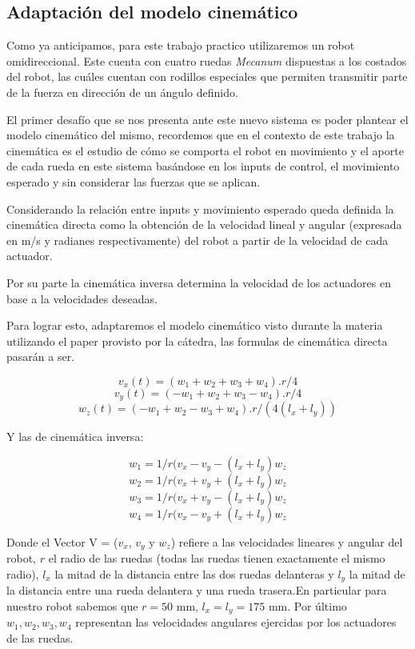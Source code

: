 \subsection{Adaptación del modelo cinemático}
Como ya anticipamos, para este trabajo practico utilizaremos un robot omidireccional. Este cuenta con cuatro ruedas  \textit{Mecanum} dispuestas a los costados del robot, las cuáles cuentan con rodillos especiales que permiten transmitir parte de la fuerza en dirección de un ángulo definido.  %


El primer desafío que se nos presenta ante este nuevo sistema es poder plantear el modelo cinemático del mismo, recordemos que en el contexto de este trabajo la cinemática es el estudio de cómo se comporta el robot en movimiento y el aporte de cada rueda en este sistema basándose en los inputs de control, el movimiento esperado y sin considerar las fuerzas que se aplican.

Considerando la relación entre inputs y movimiento esperado queda definida la cinemática directa como la obtención de la velocidad lineal y angular (expresada en m/s y radianes respectivamente) del robot a partir de la velocidad de cada actuador.

Por su parte la cinemática inversa determina la velocidad de los actuadores en base a la velocidades deseadas.

Para lograr esto, adaptaremos el modelo cinemático visto durante la materia utilizando el paper provisto por la cátedra, las formulas de cinemática directa pasarán a ser.

$$v_x(t)=(w_1+w_2+w_3+w_4).r/4$$
$$v_y(t)=(-w_1+w_2+w_3-w_4).r/4$$
$$w_z(t)=(-w_1+w_2-w_3+w_4).r/(4(l_x+l_y))$$


Y las de cinemática inversa:

$$ w_1 = 1/r (v_x - v_y - (l_x + l_y)w_z$$
$$ w_2 = 1/r (v_x + v_y + (l_x + l_y)w_z$$
$$ w_3 = 1/r (v_x + v_y - (l_x + l_y)w_z$$
$$ w_4 = 1/r (v_x - v_y + (l_x + l_y)w_z$$

Donde el Vector V = ($v_x$, $v_y$ y $w_z$) refiere a las velocidades lineares y angular del robot, $r$ el radio de las ruedas (todas las ruedas tienen exactamente el mismo radio), $l_x$ la mitad de la distancia entre las dos ruedas delanteras y $l_y$ la mitad de la distancia entre una rueda delantera y una rueda trasera.En particular para nuestro robot sabemos que $r =50 $ mm, $l_x = l_y = 175 $ mm. Por último $w_1,w_2,w_3,w_4$ representan las velocidades angulares ejercidas por los actuadores de las ruedas.

